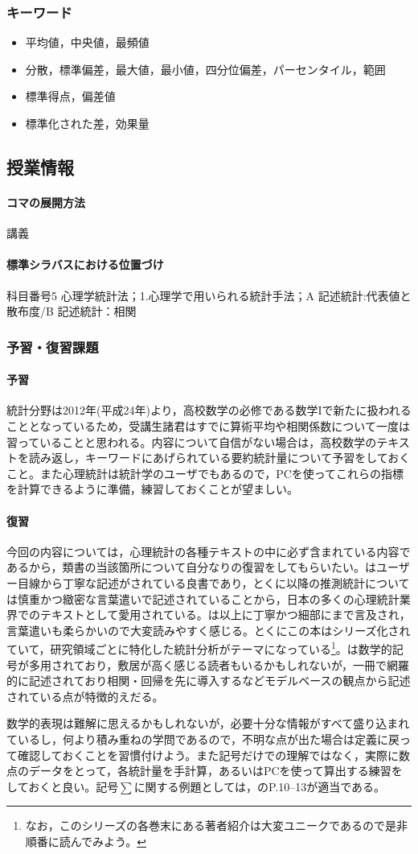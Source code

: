 \subsubsection{キーワード}
\begin{itemize}
	\item 平均値，中央値，最頻値
	\item 分散，標準偏差，最大値，最小値，四分位偏差，パーセンタイル，範囲
	\item 標準得点，偏差値
	\item 標準化された差，効果量
\end{itemize}
\subsection{授業情報}
\paragraph{コマの展開方法}
講義
\paragraph{標準シラバスにおける位置づけ}
科目番号5 心理学統計法；1.心理学で用いられる統計手法；A 記述統計:代表値と散布度/B 記述統計：相関
\subsubsection{予習・復習課題}
\paragraph{予習}
統計分野は2012年(平成24年)より，高校数学の必修である数学Iで新たに扱われることとなっているため，受講生諸君はすでに算術平均や相関係数について一度は習っていることと思われる。内容について自信がない場合は，高校数学のテキストを読み返し，キーワードにあげられている要約統計量について予習をしておくこと。また心理統計は統計学のユーザでもあるので，PCを使ってこれらの指標を計算できるように準備，練習しておくことが望ましい。
\paragraph{復習}
今回の内容については，心理統計の各種テキストの中に必ず含まれている内容であるから，類書の当該箇所について自分なりの復習をしてもらいたい。\citet{Yamada2004}はユーザー目線から丁寧な記述がされている良書であり，とくに以降の推測統計については慎重かつ緻密な言葉遣いで記述されていることから，日本の多くの心理統計業界でのテキストとして愛用されている。\citet{Kawabata201408}は\citet{Yamada2004}以上に丁寧かつ細部にまで言及され，言葉遣いも柔らかいので大変読みやすく感じる。とくにこの本はシリーズ化されていて，研究領域ごとに特化した統計分析がテーマになっている\footnote{なお，このシリーズの各巻末にある著者紹介は大変ユニークであるので是非順番に読んでみよう。}。\citet{Yamauchi201001}は数学的記号が多用されており，敷居が高く感じる読者もいるかもしれないが，一冊で網羅的に記述されており相関・回帰を先に導入するなどモデルベースの観点から記述されている点が特徴的えだる。

数学的表現は難解に思えるかもしれないが，必要十分な情報がすべて盛り込まれているし，何より積み重ねの学問であるので，不明な点が出た場合は定義に戻って確認しておくことを習慣付けよう。また記号だけでの理解ではなく，実際に数点のデータをとって，各統計量を手計算，あるいはPCを使って算出する練習をしておくと良い。記号$\sum$に関する例題としては，\citet{Yamauchi201001}のP.10--13が適当である。
